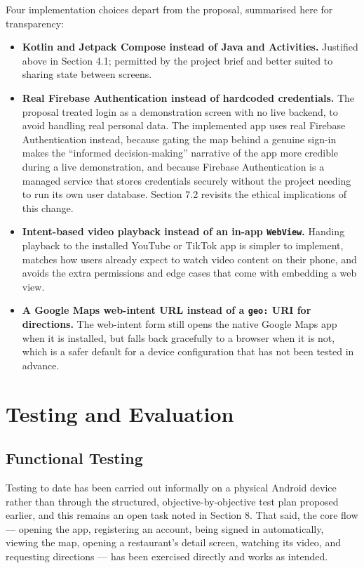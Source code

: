 \documentclass[12pt, a4paper]{article}
\begin{document}
Four implementation choices depart from the proposal, summarised here for transparency:

\begin{itemize}
    \item \textbf{Kotlin and Jetpack Compose instead of Java and Activities.} Justified above in Section 4.1; permitted by the project brief and better suited to sharing state between screens.
    \item \textbf{Real Firebase Authentication instead of hardcoded credentials.} The proposal treated login as a demonstration screen with no live backend, to avoid handling real personal data. The implemented app uses real Firebase Authentication instead, because gating the map behind a genuine sign-in makes the ``informed decision-making'' narrative of the app more credible during a live demonstration, and because Firebase Authentication is a managed service that stores credentials securely without the project needing to run its own user database. Section 7.2 revisits the ethical implications of this change.
    \item \textbf{Intent-based video playback instead of an in-app \texttt{WebView}.} Handing playback to the installed YouTube or TikTok app is simpler to implement, matches how users already expect to watch video content on their phone, and avoids the extra permissions and edge cases that come with embedding a web view.
    \item \textbf{A Google Maps web-intent URL instead of a \texttt{geo:} URI for directions.} The web-intent form still opens the native Google Maps app when it is installed, but falls back gracefully to a browser when it is not, which is a safer default for a device configuration that has not been tested in advance.
\end{itemize}

\section{Testing and Evaluation}

\subsection{Functional Testing}

Testing to date has been carried out informally on a physical Android device rather than through the structured, objective-by-objective test plan proposed earlier, and this remains an open task noted in Section 8. That said, the core flow — opening the app, registering an account, being signed in automatically, viewing the map, opening a restaurant's detail screen, watching its video, and requesting directions — has been exercised directly and works as intended.
\end{document}

